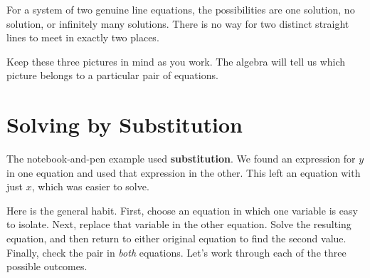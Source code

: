 \documentclass[12pt]{book}
\begin{document}
\begin{center}
\end{center}

\begin{keyidea}
For a system of two genuine line equations, the possibilities are one solution,
no solution, or infinitely many solutions. There is no way for two distinct
straight lines to meet in exactly two places.
\end{keyidea}

Keep these three pictures in mind as you work. The algebra will tell us
which picture belongs to a particular pair of equations.

\section{Solving by Substitution}

The notebook-and-pen example used \textbf{substitution}. We found an
expression for $y$ in one equation and used that expression in the other.
This left an equation with just $x$, which was easier to solve.

Here is the general habit. First, choose an equation in which one variable
is easy to isolate. Next, replace that variable in the other equation.
Solve the resulting equation, and then return to either original equation
to find the second value. Finally, check the pair in \emph{both} equations.
Let's work through each of the three possible outcomes.
\end{document}
